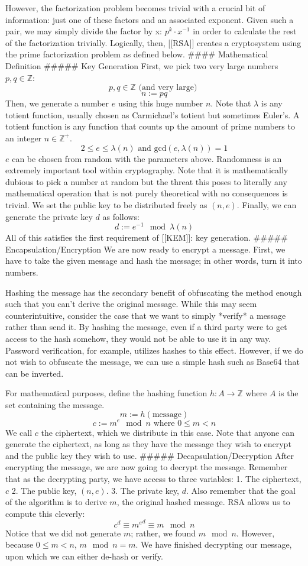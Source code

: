 \documentclass[12pt]{article}
\begin{document}
However, the factorization problem becomes trivial with a crucial bit of information: just one of these factors and an associated exponent. Given such a pair, we may simply divide the factor by x: $p^k \cdot x^{-1}$ in order to calculate the rest of the factorization trivially. Logically, then, [[RSA]] creates a cryptosystem using the prime factorization problem as defined below.  
#### Mathematical Definition
##### Key Generation
First, we pick two very large numbers $p, q \in \mathbb{Z}$: 
$$ p, q \in \mathbb{Z} \text{ (and very large) } $$
$$ n := pq$$
Then, we generate a number $e$ using this huge number $n$. Note that $\lambda$ is any totient function, usually chosen as Carmichael's totient but sometimes Euler's. A totient function is any function that counts up the amount of prime numbers to an integer $n \in \mathbb{Z}^+$. 
$$ 2 \leq e \leq \lambda(n) \text{ and } \text{gcd}(e, \lambda(n)) = 1$$
$e$ can be chosen from random with the parameters above. Randomness is an extremely important tool within cryptography. Note that it is mathematically dubious to pick a number at random but the threat this poses to literally any mathematical operation that is not purely theoretical with no consequences is trivial. We set the public key to be distributed freely as $(n, e)$. Finally, we can generate the private key $d$ as follows: 
$$ d := e^{-1} \mod{\lambda(n)} $$
All of this satisfies the first requirement of [[KEM]]: key generation. 
##### Encapsulation/Encryption
We are now ready to encrypt a message. First, we have to take the given message and hash the message; in other words, turn it into numbers. 

Hashing the message has the secondary benefit of obfuscating the method enough such that you can't derive the original message. While this may seem counterintuitive, consider the case that we want to simply *verify* a message rather than send it. By hashing the message, even if a third party were to get access to the hash somehow, they would not be able to use it in any way. Password verification, for example, utilizes hashes to this effect. However, if we do not wish to obfuscate the message, we can use a simple hash such as Base64 that can be inverted. 

For mathematical purposes, define the hashing function $h: A \to \mathbb{Z}$ where $A$ is the set containing the message.
$$ m := h(\text{message})$$
$$ c := m^e\mod{n} \text{  where } 0 \leq m < n$$
We call $c$ the ciphertext, which we distribute in this case. Note that anyone can generate the ciphertext, as long as they have the message they wish to encrypt and the public key they wish to use. 
##### Decapsulation/Decryption
After encrypting the message, we are now going to decrypt the message. Remember that as the decrypting party, we have access to three variables: 
1. The ciphertext, $c$
2. The public key, $(n, e)$. 
3. The private key, $d$. 
Also remember that the goal of the algorithm is to derive $m$, the original hashed message. RSA allows us to compute this cleverly:  
$$ c^d \equiv {m^e}^d \equiv m \mod{n}$$
Notice that we did not generate $m$; rather, we found $m \mod{n}$. However, because $0 \leq m < n$, $m \mod{n} = m$. We have finished decrypting our message, upon which we can either de-hash or verify. 
\end{document}
